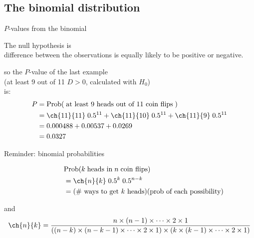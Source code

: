 \subsection{The binomial distribution}

\begin{frame}{$P$-values from the binomial}

  The null hypothesis is \\
  \hspace{2em}  difference between the observations is equally likely to be positive or negative.

    \vspace{2em}

    so the $P$-value of the last example \\
    (at least 9 out of 11 $D>0$, calculated with $H_0$) \\
    is:
    \begin{align*} 
      P &= \mbox{Prob}( \; \text{at least 9 heads out of 11 coin flips}\; ) \\
       &= 
         \ch{11}{11} \; 0.5^{11} + 
         \ch{11}{10} \; 0.5^{11} + 
         \ch{11}{9} \; 0.5^{11} \\
       &= 
       0.000488 + 0.00537 + 0.0269  \\
       &= 0.0327
     \end{align*}

\end{frame}

\begin{frame}{Reminder: binomial probabilities}

  \begin{align*}
    &\mbox{Prob}( k \; \text{heads in} \; n \; \text{coin flips} ) \\
    \qquad \qquad &= \ch{n}{k} \; 0.5^k \; 0.5^{n-k} \\
    \qquad \qquad &= \text{(\# ways to get $k$ heads)} \text{(prob of each possibility)}
  \end{align*}

  \vspace{2em}
  and
  \[
  \ch{n}{k} = \frac{ n \times (n-1) \times \cdots \times 2 \times 1 }{ ( (n-k) \times (n-k-1) \times \cdots \times 2 \times 1) \times ( k \times (k-1) \times \cdots \times 2 \times 1) }
  \]


\end{frame}


